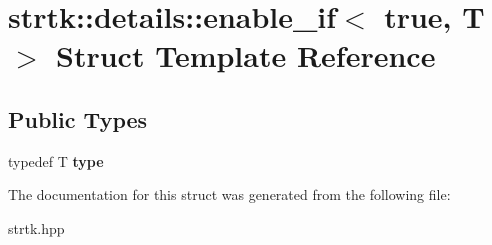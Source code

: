 \hypertarget{structstrtk_1_1details_1_1enable__if_3_01true_00_01T_01_4}{\section{strtk\-:\-:details\-:\-:enable\-\_\-if$<$ true, T $>$ Struct Template Reference}
\label{structstrtk_1_1details_1_1enable__if_3_01true_00_01T_01_4}
}
\subsection*{Public Types}
\begin{DoxyCompactItemize}
\item 
\hypertarget{structstrtk_1_1details_1_1enable__if_3_01true_00_01T_01_4_aad3787a57c2c6c8ef4a051801a69ec82}{typedef T {\bfseries type}}\label{structstrtk_1_1details_1_1enable__if_3_01true_00_01T_01_4_aad3787a57c2c6c8ef4a051801a69ec82}

\end{DoxyCompactItemize}


The documentation for this struct was generated from the following file\-:\begin{DoxyCompactItemize}
\item 
strtk.\-hpp\end{DoxyCompactItemize}
